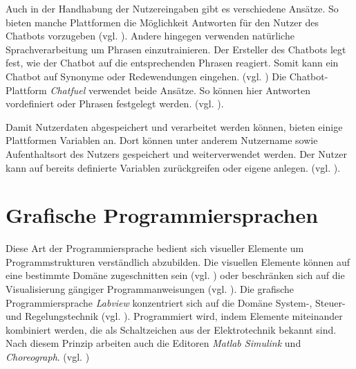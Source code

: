 Auch in der Handhabung der Nutzereingaben gibt es verschiedene Ansätze. So bieten manche Plattformen die Möglichkeit Antworten für den Nutzer des Chatbots vorzugeben (vgl. \cite{Chatfuel3:online} \cite{WelcomeM66:online}). Andere hingegen verwenden natürliche Sprachverarbeitung um Phrasen einzutrainieren. Der Ersteller des Chatbots legt fest, wie der Chatbot auf die entsprechenden Phrasen reagiert. Somit kann ein Chatbot auf Synonyme oder Redewendungen eingehen. (vgl. \cite{BotsifyC64:online} \cite{Dialogfl40:online} \cite{KatalogI56:online}) Die Chatbot-Plattform \emph{Chatfuel} verwendet beide Ansätze. So können hier Antworten vordefiniert oder Phrasen festgelegt werden. (vgl. \cite{Chatfuel3:online}). 

Damit Nutzerdaten abgespeichert und verarbeitet werden können, bieten einige Plattformen Variablen an. Dort können unter anderem Nutzername sowie Aufenthaltsort des Nutzers gespeichert und weiterverwendet werden. Der Nutzer kann auf bereits definierte Variablen zurückgreifen oder eigene anlegen. (vgl. \cite{Chatfuel3:online} \cite{Converse15:online} \cite{Dialogfl40:online} \cite{KatalogI56:online} \cite{WelcomeM66:online}).


\section{Grafische Programmiersprachen}

Diese Art der Programmiersprache bedient sich visueller Elemente um Programmstrukturen verständlich abzubilden. Die visuellen Elemente können auf eine bestimmte Domäne zugeschnitten sein (vgl. \cite{WasistLa94:online}) oder beschränken sich auf die Visualisierung gängiger Programmanweisungen (vgl. \cite{BlocklyG57:online}). Die grafische Programmiersprache \emph{Labview} konzentriert sich auf die Domäne System-, Steuer- und Regelungstechnik (vgl. \cite{WasistLa94:online}). Programmiert wird, indem Elemente miteinander kombiniert werden, die als Schaltzeichen aus der Elektrotechnik bekannt sind. Nach diesem Prinzip arbeiten auch die Editoren \emph{Matlab Simulink} und \emph{Choreograph}. (vgl. \cite{Choregra47:online} \cite{Simulink28:online})

